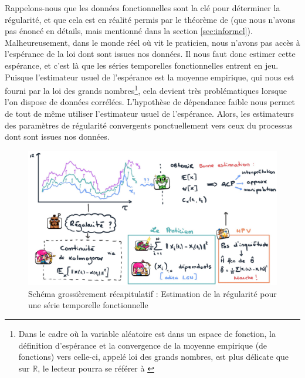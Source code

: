 
Rappelons-nous que les données fonctionnelles sont la clé pour déterminer la régularité, et que cela est en réalité permis par le théorème de  (que nous n'avons pas énoncé en détails, mais mentionné dans la section \ref{sec:informel}). Malheureusement, dans le monde réel où vit le praticien, nous n'avons pas accès à l'espérance de la loi dont sont issues nos données. Il nous faut donc estimer cette espérance, et c'est là que les séries temporelles fonctionnelles entrent en jeu. Puisque l'estimateur usuel de l'espérance est la moyenne empirique, qui nous est fourni par la loi des grands nombres\footnote{Dans le cadre où la variable aléatoire est dans un espace de fonction, la définition d'espérance et la convergence de la moyenne empirique (de fonctions) vers celle-ci, appelé loi des grands nombres, est plus délicate que sur $\mathds R$, le lecteur pourra se référer à \cite{HsingEubankTheoreticalFoundationsOfFDA}}, cela devient très problématiques lorsque l'on dispose de données corrélées.
L'hypothèse de dépendance faible nous permet de tout de même utiliser l'estimateur usuel de l'espérance. Alors, les estimateurs des paramètres de régularité convergents ponctuellement vers ceux du processus dont sont issues nos données.

\begin{figure}[H]
	\centering
	\includegraphics[width=\textwidth]{Images/sketches/schema_ts_estim_reg.jpg}
	\caption{Schéma grossièrement récapitulatif : Estimation de la régularité pour une série temporelle fonctionnelle}
	\label{fig:recap_estim_reg_fts}
\end{figure}
